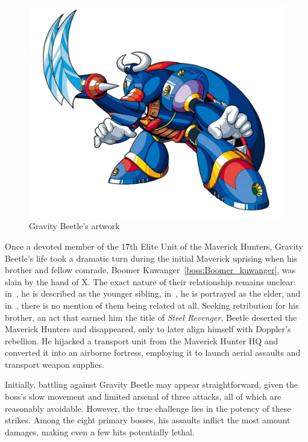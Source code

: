 \begin{figure}[htp]
	\centering
	\includegraphics[height=\portraitsize]{figures/X3/Gravity_beetle/gravitybeetle.png}
	\caption{Gravity Beetle's artwork~\cite{book:MMX_Complete_art}}
\end{figure}

Once a devoted member of the 17th Elite Unit of the Maverick Hunters, Gravity Beetle's life took a dramatic turn during the initial Maverick uprising when his brother and fellow comrade, Boomer Kuwanger~\ref{boss:Boomer_kuwanger}, was slain by the hand of X. The exact nature of their relationship remains unclear: in~\cite{book:Compendium}, he is described as the younger sibling, in~\cite{wayback:X3_resources}, he is portrayed as the elder, and in~\cite{Xcoll1:Manual_X3}, there is no mention of them being related at all. Seeking retribution for his brother, an act that earned him the title of \textit{Steel Revenger}\cite{book:MMX_Complete_art}, Beetle deserted the Maverick Hunters and disappeared, only to later align himself with Doppler's rebellion. He hijacked a transport unit from the Maverick Hunter HQ and converted it into an airborne fortress, employing it to launch aerial assaults and transport weapon supplies\cite{Xcoll1:Manual_X3,wayback:X3_resources,wiki:Gravity_beetle}.
 
Initially, battling against Gravity Beetle may appear straightforward, given the boss's slow movement and limited arsenal of three attacks, all of which are reasonably avoidable. However, the true challenge lies in the potency of these strikes. Among the eight primary bosses, his assaults inflict the most amount damages, making even a few hits potentially lethal.

